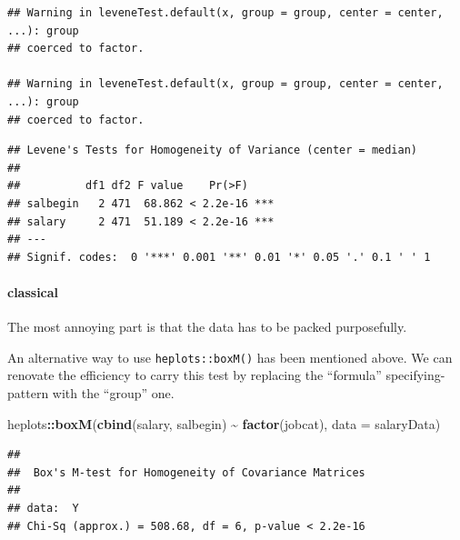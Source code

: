 \documentclass[
]{ctexart}
\newenvironment{Shaded}{\begin{snugshade}}{\end{snugshade}}
\newcommand{\AttributeTok}[1]{\textcolor[rgb]{0.13,0.29,0.53}{#1}}
\newcommand{\FunctionTok}[1]{\textcolor[rgb]{0.13,0.29,0.53}{\textbf{#1}}}
\newcommand{\NormalTok}[1]{#1}
\newcommand{\SpecialCharTok}[1]{\textcolor[rgb]{0.81,0.36,0.00}{\textbf{#1}}}
\begin{document}
\begin{Shaded}
\end{Shaded}

\begin{verbatim}
## Warning in leveneTest.default(x, group = group, center = center, ...): group
## coerced to factor.

## Warning in leveneTest.default(x, group = group, center = center, ...): group
## coerced to factor.
\end{verbatim}

\begin{verbatim}
## Levene's Tests for Homogeneity of Variance (center = median)
## 
##          df1 df2 F value    Pr(>F)    
## salbegin   2 471  68.862 < 2.2e-16 ***
## salary     2 471  51.189 < 2.2e-16 ***
## ---
## Signif. codes:  0 '***' 0.001 '**' 0.01 '*' 0.05 '.' 0.1 ' ' 1
\end{verbatim}

\hypertarget{classical}{%
\paragraph{classical}\label{classical}}

The most annoying part is that the data has to be packed purposefully.

An alternative way to use \texttt{heplots::boxM()} has been mentioned
above. We can renovate the efficiency to carry this test by replacing
the ``formula'' specifying-pattern with the ``group'' one.

\begin{Shaded}
\begin{Highlighting}[]
\NormalTok{heplots}\SpecialCharTok{::}\FunctionTok{boxM}\NormalTok{(}\FunctionTok{cbind}\NormalTok{(salary, salbegin) }\SpecialCharTok{\textasciitilde{}} \FunctionTok{factor}\NormalTok{(jobcat), }
              \AttributeTok{data =}\NormalTok{ salaryData)}
\end{Highlighting}
\end{Shaded}

\begin{verbatim}
## 
##  Box's M-test for Homogeneity of Covariance Matrices
## 
## data:  Y
## Chi-Sq (approx.) = 508.68, df = 6, p-value < 2.2e-16
\end{verbatim}
\end{document}
